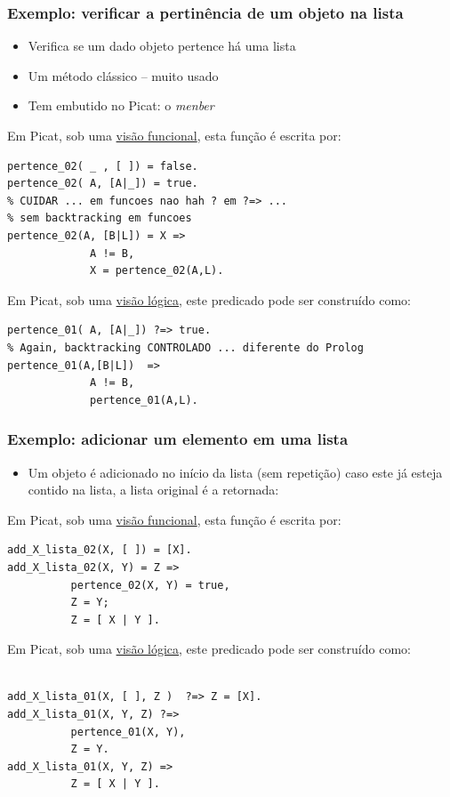 \begin{frame}[fragile, allowframebreaks=0.9]
\frametitle{Exemplo: verificar a pertinência de um objeto na lista}

\begin{itemize}
  \item Verifica se um dado objeto pertence há uma  lista
  \item Um método clássico -- muito usado
  \item Tem embutido no Picat: o \textit{menber}
\end{itemize}

Em Picat, sob uma \underline{visão funcional}, esta função é escrita por:

 \begin{verbatim}
pertence_02( _ , [ ]) = false. 
pertence_02( A, [A|_]) = true. 
% CUIDAR ... em funcoes nao hah ? em ?=> ... 
% sem backtracking em funcoes
pertence_02(A, [B|L]) = X => 
             A != B,
             X = pertence_02(A,L).
\end{verbatim}



\framebreak
Em Picat, sob uma \underline{visão lógica}, este predicado 
pode ser construído como:
\begin{verbatim}
pertence_01( A, [A|_]) ?=> true. 
% Again, backtracking CONTROLADO ... diferente do Prolog
pertence_01(A,[B|L])  => 
             A != B,
             pertence_01(A,L).
\end{verbatim}

\end{frame}


\begin{frame}[fragile, allowframebreaks=0.9]
\frametitle{Exemplo: adicionar um elemento  em uma lista}

\begin{itemize}
  \item Um objeto é adicionado no início da lista (sem repeti\c{c}ão) caso este já
 esteja contido na lista, a lista original é a retornada:
\end{itemize}

Em Picat, sob uma \underline{visão funcional}, esta função é escrita por:
 
\begin{verbatim}
add_X_lista_02(X, [ ]) = [X]. 
add_X_lista_02(X, Y) = Z =>
          pertence_02(X, Y) = true,
          Z = Y;
          Z = [ X | Y ].
\end{verbatim}


\framebreak
Em Picat, sob uma \underline{visão lógica}, este predicado 
pode ser construído como:
\begin{verbatim}

add_X_lista_01(X, [ ], Z )  ?=> Z = [X]. 
add_X_lista_01(X, Y, Z) ?=>
          pertence_01(X, Y),
          Z = Y.
add_X_lista_01(X, Y, Z) =>
          Z = [ X | Y ].

\end{verbatim}

\end{frame}




